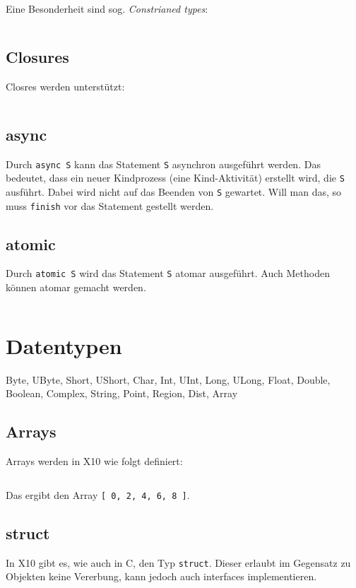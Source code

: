 Eine Besonderheit sind sog. \textit{Constrianed types}:

\inputminted[numbersep=5pt, tabsize=4]{scala}{scripts/x10/constrained-type-example.x10}

\subsection{Closures}%

Closres werden unterstützt:

\inputminted[numbersep=5pt, tabsize=4]{scala}{scripts/x10/closures-example.x10}

\subsection{async}%

Durch \texttt{async S} kann das Statement \texttt{S} asynchron ausgeführt werden.
Das bedeutet, dass ein neuer Kindprozess (eine Kind-Aktivität) erstellt wird, die
\texttt{S} ausführt. Dabei wird nicht auf das Beenden von \texttt{S} gewartet.
Will man das, so muss \texttt{finish} vor das Statement gestellt werden.

\subsection{atomic}%
Durch \texttt{atomic S} wird das Statement \texttt{S} atomar ausgeführt. Auch
Methoden können atomar gemacht werden.

\inputminted[numbersep=5pt, tabsize=4]{scala}{scripts/x10/atomic-example.x10}

\section{Datentypen}
Byte, UByte, Short, UShort, Char, Int, UInt, Long, ULong, Float, Double, Boolean, 
Complex, String, Point, Region, Dist, Array

\subsection{Arrays}%
Arrays werden in X10 wie folgt definiert:

\inputminted[numbersep=5pt, tabsize=4]{scala}{scripts/x10/array-example.x10}

Das ergibt den Array \texttt{[ 0, 2, 4, 6, 8 ]}.

\subsection{struct}%
In X10 gibt es, wie auch in C, den Typ \texttt{struct}. Dieser erlaubt im Gegensatz
zu Objekten keine Vererbung, kann jedoch auch interfaces implementieren.

